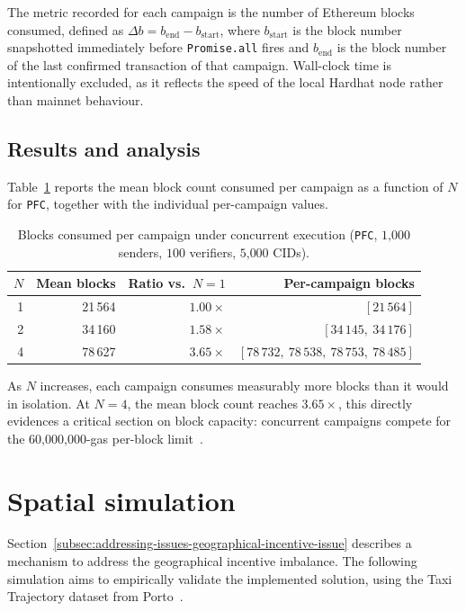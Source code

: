 The metric recorded for each campaign is the number of Ethereum blocks
consumed, defined as $\Delta b = b_{\mathrm{end}} - b_{\mathrm{start}}$,
where $b_{\mathrm{start}}$ is the block number snapshotted immediately before
\texttt{Promise.all} fires and $b_{\mathrm{end}}$ is the block number of the
last confirmed transaction of that campaign. Wall-clock time is intentionally
excluded, as it reflects the speed of the local Hardhat node rather than
mainnet behaviour.

\subsection{Results and analysis}\label{subsec:proto-evaluation-concurrent-execution-results-analysis}

Table~\ref{tab:concurrent-blocks} reports the mean block count consumed per
campaign as a function of $N$ for \texttt{PFC}, together with the individual
per-campaign values.

\begin{table}
    \centering
    \begin{tabular}{|r|r|r|r|}
        \hline
        $N$ & Mean blocks & Ratio vs.\ $N{=}1$ & Per-campaign blocks \\
        \hline
        1 & 21\,564 & $1.00\times$ & $[21\,564]$ \\
        \hline
        2 & 34\,160 & $1.58\times$ & $[34\,145,\ 34\,176]$ \\
        \hline
        4 & 78\,627 & $3.65\times$ & $[78\,732,\ 78\,538,\ 78\,753,\ 78\,485]$ \\
        \hline
    \end{tabular}
    \caption{Blocks consumed per campaign under concurrent execution (\texttt{PFC},
        $1\text{,}000$ senders, $100$ verifiers, $5\text{,}000$ CIDs).}
    \label{tab:concurrent-blocks}
\end{table}

As $N$ increases, each campaign consumes measurably more blocks than it would
in isolation.
At $N = 4$, the mean block count reaches $3.65\times$, this directly evidences a critical section on block
capacity: concurrent campaigns compete for the $60\text{,}000\text{,}000$-gas
per-block limit~\cite{eip7935}.

\section{Spatial simulation}\label{sec:spatial-simulation}
Section~\ref{subsec:addressing-issues-geographical-incentive-issue} describes a
mechanism to address the geographical incentive imbalance.
The following simulation aims to empirically validate the implemented solution,
using the Taxi Trajectory dataset from Porto~\cite{taxi_trajectory_ecml2015}.

